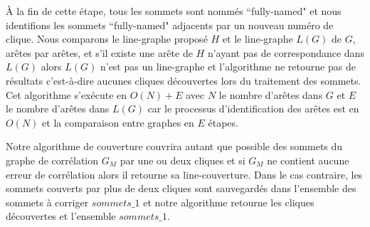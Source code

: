 \`A la fin de cette \'etape, tous les sommets sont nomm\'es ``fully-named" et nous identifions les sommets ``fully-named" adjacents par un nouveau num\'ero de clique.
\newline
Nous comparons le line-graphe propos\'e $H$ et le line-graphe $L(G)$ de $G$, ar\^etes par ar\^etes, et s'il existe une ar\^ete de $H$ n'ayant pas de correspondance dans $L(G)$ alors $L(G)$ n'est pas un line-graphe et l'algorithme ne retourne pas de r\'esultats c'est-\`a-dire aucunes cliques d\'ecouvertes lors du traitement des sommets.
Cet algorithme s'ex\'ecute en $O(N)+E$ avec $N$  le nombre d'ar\^etes dans $G$ et $E$ le nombre d'ar\^etes dans $L(G)$ car le processus d'identification des ar\^etes est en $O(N)$ et la comparaison entre graphes en $E$ \'etapes.
\newline

Notre algorithme de couverture  couvrira autant que possible des sommets du graphe de corr\'elation  $G_M$ par une ou deux cliques et si $G_M$ ne contient aucune erreur de corr\'elation alors il retourne sa line-couverture. Dans le cas contraire, les sommets couverts par plus de deux cliques sont sauvegard\'es dans l'ensemble des sommets \`a corriger $sommets\_1$ et notre algorithme retourne les cliques d\'ecouvertes et l'ensemble $sommets\_1$.

